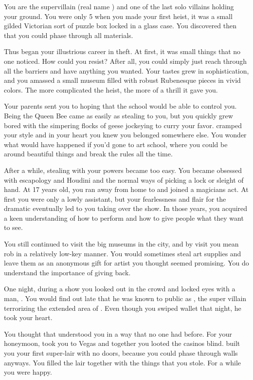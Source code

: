 \documentclass[char]{LRSguildcamp1}
\begin{document}
\name{\cGrandma{}}

You are the supervillain \cGrandma{\MYsupername} (real name \cGrandma{\intro}) and one of the last solo villains holding your ground. You were only 5 when you made your first heist, it was a small gilded Victorian sort of puzzle box locked in a glass case. You discovered then that you could phase through all materials. 

Thus began your illustrious career in theft. At first, it was small things that no one noticed. How could you resist? After all, you could simply just reach through all the barriers and have anything you wanted. Your tastes grew in sophistication, and you amassed a small museum filled with robust Rubenesque pieces in vivid colors. The more complicated the heist, the more of a thrill it gave you. 

Your parents sent you to \pSuperSchool{} hoping that the school would be able to control you. Being the Queen Bee came as  easily as stealing to you, but you quickly grew bored with the simpering flocks of geese jockeying to curry your favor. \pSuperSchool{} cramped your style and in your heart you knew you belonged somewhere else. You wonder what would have happened if you'd gone to art school, where you could be around beautiful things and break the rules all the time. 

After a while, stealing with your powers became too easy. You became obsessed with escapology and Houdini and the normal ways of picking a lock or sleight of hand. At 17 years old, you ran away from home to \pCityGrandma{} and joined a magicians act. At first you were only a lowly assistant, but your fearlessness and flair for the dramatic eventually led to you taking over the show. In those years, you acquired a keen understanding of how to perform and how to give people what they want to see. 

You still continued to visit the big museums in the city, and by visit you mean rob in a relatively low-key manner. You would sometimes steal art supplies and leave them as an anonymous gift for artist you thought seemed promising. You do understand the importance of giving back. 

One night, during a show you looked out in the crowd and locked eyes with a man, \cGS{\intro}. You would find out late that he was known to public as \cGS{}, the super villain terrorizing the extended area of \pCityO{}. Even though you swiped \cGS{\their} wallet that night, he took your heart. 

You thought that \cGS{\intro} understood you in a way that no one had before. For your honeymoon, \cGS{\they} took you to Vegas and together you looted the casinos blind. \cGS{\They} built you your first super-lair with no doors, because you could phase through walls anyways. You filled the lair together with the things that you stole. For a while you were happy. 
\end{document}

